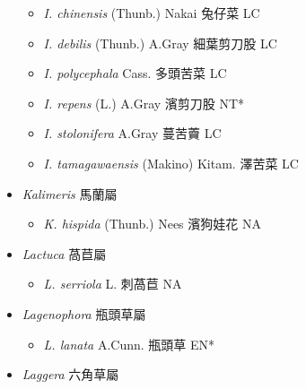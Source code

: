 \begin{itemize}
  \begin{itemize}
        \item[] \textit{I. chinensis} (Thunb.) Nakai  兔仔菜   LC
        \item[] \textit{I. debilis} (Thunb.) A.Gray  細葉剪刀股   LC
        \item[] \textit{I. polycephala} Cass.  多頭苦菜   LC
        \item[] \textit{I. repens} (L.) A.Gray  濱剪刀股   NT*
        \item[] \textit{I. stolonifera} A.Gray  蔓苦藚   LC
        \item[] \textit{I. tamagawaensis} (Makino) Kitam.  澤苦菜   LC
  \end{itemize}
 \item[] \textit{Kalimeris} 馬蘭屬
                                
  \begin{itemize}
        \item[] \textit{K. hispida} (Thunb.) Nees  濱狗娃花   NA
  \end{itemize}
 \item[] \textit{Lactuca} 萵苣屬
                                
  \begin{itemize}
        \item[] \textit{L. serriola} L.  刺萵苣   NA
  \end{itemize}
 \item[] \textit{Lagenophora} 瓶頭草屬
                                
  \begin{itemize}
        \item[] \textit{L. lanata} A.Cunn.  瓶頭草   EN*
  \end{itemize}
 \item[] \textit{Laggera} 六角草屬
                                

\end{itemize}
